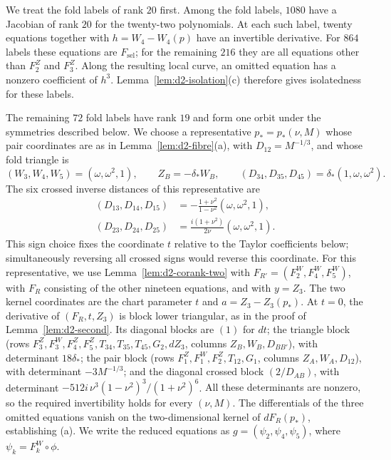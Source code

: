\documentclass[11pt]{amsart}
\theoremstyle{definition}
\theoremstyle{remark}
\begin{document}
{We treat the fold labels of rank $20$ first.
Among the fold labels, $1080$ have a Jacobian of rank $20$ for the
twenty-two polynomials.  At each such label, twenty equations together with
$h=W_4-W_4(p)$ have an invertible derivative.
For $864$ labels these equations are $F_{\mathrm{sel}}$; for the remaining $216$ they are
all equations other than $F^Z_2$ and $F^Z_3$.
Along the resulting local curve, an omitted equation has a nonzero coefficient of
$h^3$.  Lemma~\ref{lem:d2-isolation}(c) therefore gives isolatedness for these labels.}

{The remaining $72$ fold labels have rank $19$ and form one orbit
under the symmetries described below.
We choose a representative $p_*=p_*(\nu,M)$ whose pair coordinates are as in
Lemma~\ref{lem:d2-fibre}(a), with $D_{12}=M^{-1/3}$, and whose fold triangle is}
\[
  (W_3,W_4,W_5)=(\omega,\omega^2,1),\qquad Z_B=-\delta_*W_B,\qquad
  (D_{34},D_{35},D_{45})=\delta_*(1,\omega,\omega^2).
\]
{The six crossed inverse distances of this representative are
\[
\begin{aligned}
 (D_{13},D_{14},D_{15})&=-\frac{1+\nu^2}{1-\nu^2}(\omega,\omega^2,1),\\
 (D_{23},D_{24},D_{25})&=\frac{i(1+\nu^2)}{2\nu}(\omega,\omega^2,1).
\end{aligned}
\]
This sign choice fixes the coordinate $t$ relative to the Taylor coefficients below;
simultaneously reversing all crossed signs would reverse this coordinate.}
{For this representative, we use Lemma~\ref{lem:d2-corank-two} with
$F_{R'}=(F^W_2,F^W_4,F^W_5)$, with $F_R$ consisting of the other nineteen equations, and
with $y=Z_3$.
The two kernel coordinates are the chart parameter $t$ and $a=Z_3-Z_3(p_*)$.
At $t=0$, the derivative of $(F_R,t,Z_3)$ is block lower triangular, as in the proof of
Lemma~\ref{lem:d2-second}.
Its diagonal blocks are $(1)$ for $dt$; the triangle block}
(rows $F^Z_3,F^W_3,F^Z_4,F^Z_5,T_{34},T_{35},T_{45},G_2,dZ_3$, columns $Z_B,W_B,D_{BB'}$), with
determinant $18\delta_*$; the pair block (rows $F^Z_1,F^W_1,F^Z_2,T_{12},G_1$, columns
$Z_A,W_A,D_{12}$), with determinant $-3M^{-1/3}$; and the diagonal crossed block $(2/D_{AB})$,
with determinant $-512i\,\nu^3(1-\nu^2)^3/(1+\nu^2)^6$.
{All these determinants are nonzero, so the required invertibility
holds for every $(\nu,M)$.
The differentials of the three omitted equations vanish on the two-dimensional kernel
of $dF_R(p_*)$, establishing (a).
We write the reduced equations as $g=(\psi_2,\psi_4,\psi_5)$, where
$\psi_k=F^W_k\circ\phi$.}
\end{document}
